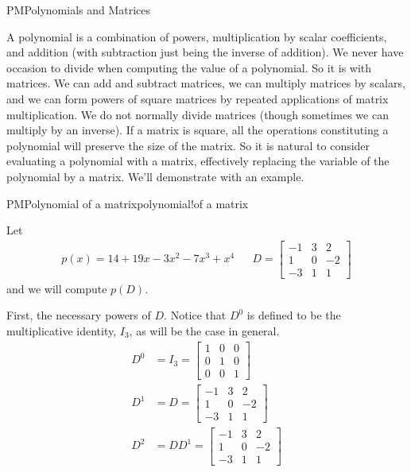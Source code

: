 %
\begin{subsect}{PM}{Polynomials and Matrices}
%
\begin{para}A polynomial is a combination of powers, multiplication by scalar coefficients, and addition (with subtraction just being the inverse of addition).  We never have occasion to divide when computing the value of a polynomial.  So it is with matrices.  We can add and subtract matrices, we can multiply matrices by scalars, and we can form powers of square matrices by repeated applications of matrix multiplication.  We do not normally divide matrices (though sometimes we can multiply by an inverse).  If a matrix is square, all the operations constituting a polynomial will preserve the size of the matrix.  So it is natural to consider evaluating a polynomial with a matrix, effectively replacing the variable of the polynomial by a matrix.  We'll demonstrate with an example.\end{para}
%
\begin{example}{PM}{Polynomial of a matrix}{polynomial!of a matrix}
\begin{para}Let
%
\begin{align*}
p(x)=14+19x-3x^2-7x^3+x^4
&&
D=\begin{bmatrix}-1 & 3 & 2\\1 & 0 & -2\\-3 & 1 & 1\end{bmatrix}
\end{align*}
%
and we will compute $p(D)$.\end{para}
%
\begin{para}First, the necessary powers of $D$.  Notice that $D^0$ is defined to be the multiplicative identity, $I_3$, as will be the case in general.
%
\begin{align*}
D^0&=I_3=\begin{bmatrix}1 & 0 & 0\\0 & 1 & 0\\0 & 0 & 1\end{bmatrix}\\
%
D^1&=D=\begin{bmatrix}-1 & 3 & 2\\1 & 0 & -2\\-3 & 1 & 1\end{bmatrix}\\
%
D^2&=DD^1=
\begin{bmatrix}-1 & 3 & 2\\1 & 0 & -2\\-3 & 1 & 1\end{bmatrix}

\end{align*}
\end{para}
\end{example}
\end{subsect}
